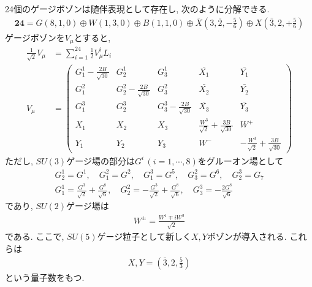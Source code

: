 24個のゲージボゾンは随伴表現として存在し, 次のように分解できる.
\begin{align}
  \bm{24} = G(8,1,0)\oplus W(1,3,0)\oplus B(1,1,0)\oplus \bar{X}(3,\bar{2},-\frac{5}{6})\oplus X(\bar{3},2,+\frac{5}{6})
\end{align}
ゲージボゾンを$V_\mu$とすると,
\begin{align}
  \frac{1}{\sqrt{2}}V_\mu &= \sum_{i=1}^{24}\frac{1}{2}V_\mu^i L_i\\
  V_\mu &= \left(\begin{array}{ccccc}
    G^1_1 - \frac{2B}{\sqrt{30}} & G^1_2 & G^1_3 & \bar{X_1} & \bar{Y_1} \\
    G^2_1 & G^2_2 - \frac{2B}{\sqrt{30}} & G^2_3 & \bar{X_2} & \bar{Y_2} \\
    G^3_1 & G^3_2 & G^3_3 - \frac{2B}{\sqrt{30}} & \bar{X_3} & \bar{Y_3} \\
    X_1   & X_2 & X_3 & \frac{W^3}{\sqrt{2}} + \frac{3B}{\sqrt{30}} & W^+ \\
    Y_1   & Y_2 & Y_3 & W^- &    -\frac{W^3}{\sqrt{2}} + \frac{3B}{\sqrt{30}} 
      \end{array}
  \right)
\end{align}
ただし, $SU(3)$ゲージ場の部分は$G^i\,(i=1,\cdots,8)$をグルーオン場として
\begin{align}
  G^1_2 = G^1,\quad G^2_1 = G^2,\quad G^3_1 = G^5,\quad G^2_3 = G^6,\quad G^3_2 = G_7\nonumber\\
  G^1_1 = \frac{G^3}{\sqrt{2}} + \frac{G^8}{\sqrt{6}},\quad G^2_2=-\frac{G^3}{\sqrt{2}}+\frac{G^8}{\sqrt{6}},\quad G^3_3 = -\frac{2G^8}{\sqrt{6}}\nonumber
\end{align}
であり, $SU(2)$ゲージ場は
\begin{align}
  W^\pm = \frac{W^1\mp iW^2}{\sqrt{2}}\nonumber
\end{align}
である.
ここで, $SU(5)$ゲージ粒子として新しく$X, Y$ボゾンが導入される.
これらは
\begin{align}
  X, Y = \left(\bar{3},2, \frac{5}{3}\right)\label{XY_bosons}
\end{align}
という量子数をもつ.

